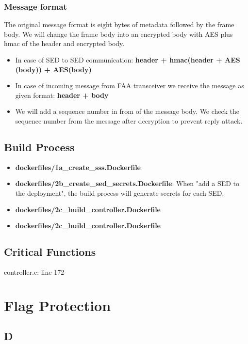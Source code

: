 \documentclass[11pt,oneside,onecolumn,letterpaper]{article}
\begin{document}
\subsubsection{Message format}
The original message format is eight bytes of metadata followed by the frame body.
We will change the frame body into an encrypted body with AES plus hmac of the header and encrypted body.

  \begin{itemize}
  \item In case of SED to SED communication: \textbf{header + hmac(header + AES (body)) + AES(body)}
  \item In case of incoming message from FAA transceiver we receive the message as given format: \textbf{header + body}
  \end{itemize}
  \begin{itemize}
  \item We will add a sequence number in from of the message body. We check the sequence number from the message after decryption to prevent reply attack.
  \end{itemize}

\subsection{Build Process}

  \begin{itemize}
    \item \textbf{dockerfiles/1a\_create\_sss.Dockerfile}
    \item \textbf{dockerfiles/2b\_create\_sed\_secrets.Dockerfile}: When "add a SED to the deployment", the build process will generate secrets for each SED.
    \item \textbf{dockerfiles/2c\_build\_controller.Dockerfile}
    \item \textbf{dockerfiles/2c\_build\_controller.Dockerfile}
  \end{itemize}

\subsection{Critical Functions}
controller.c: line 172


\section{Flag Protection}

\subsection{\textsf{D}}
\end{document}
